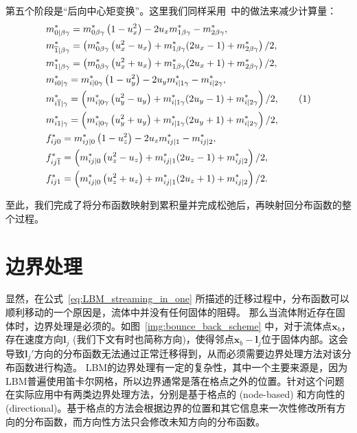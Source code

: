 第五个阶段是“后向中心矩变换”。这里我们同样采用~\citep{Geier-2015}中的做法来减少计算量：
\begin{align*}
    & m_{0 \mid \beta \gamma}^{*}=m_{0 \beta \gamma}^{*}\left(1-u_x^{2}\right)-2u_x m_{1 \beta \gamma}^{*}-m_{2 \beta \gamma}^{*}, \\
    & m_{\overline{1} \mid \beta \gamma}^{*}=\left(m_{0 \beta \gamma}^{*}\left(u_x^{2}-u_x\right)+m_{1 \beta \gamma}^{*}(2 u_x-1)+m_{2 \beta \gamma}^{*}\right) / 2, \\
    & m_{1 \mid \beta \gamma}^{*}=\left(m_{0 \beta \gamma}^{*}\left(u_x^{2}+u_x\right)+m_{1 \beta \gamma}^{*}(2 u_x+1)+m_{2 \beta \gamma}^{*}\right) / 2, \\
    & m_{i 0 \mid \gamma}^{*}=m_{i \mid 0 \gamma}^{*}\left(1-u_y^{2}\right)-2u_y m_{i \mid 1 \gamma}^{*}-m_{i \mid 2 \gamma}^{*}, \\
    & m_{i \overline{1} \mid \gamma}^{*}=\left(m_{i \mid 0 \gamma}^{*}\left(u_y^{2}-u_y\right)+m_{i \mid 1 \gamma}^{*}(2 u_y-1)+m_{i \mid 2 \gamma}^{*}\right) / 2, \stepcounter{equation}\tag{\theequation} \\
    & m_{i 1 \mid \gamma}^{*}=\left(m_{i \mid 0 \gamma}^{*}\left(u_y^{2}+u_y\right)+m_{i \mid 1 \gamma}^{*}(2 u_y+1)+m_{i \mid 2 \gamma}^{*}\right) / 2, \\
    & f_{i j 0}^{*}=m_{i j \mid 0}^{*}\left(1-u_z^{2}\right)-2u_z m_{i j \mid 1}^{*}-m_{i j \mid 2}^{*}, \\
    & f_{i j \overline{1}}^{*}=\left(m_{i j \mid 0}^{*}\left(u_z^{2}-u_z\right)+m_{i j \mid 1}^{*}(2 u_z-1)+m_{i j \mid 2}^{*}\right) / 2, \\
    & f_{i j 1}^{*}=\left(m_{i j \mid 0}^{*}\left(u_z^{2}+u_z\right)+m_{i j \mid 1}^{*}(2 u_z+1)+m_{i j \mid 2}^{*}\right) / 2 .
\end{align*}

至此，我们完成了将分布函数映射到累积量并完成松弛后，再映射回分布函数的整个过程。
    

\section{边界处理}
\label{sec:boundary_treatment}
显然，在公式~\ref{eq:LBM_streaming_in_one} 所描述的迁移过程中，分布函数可以顺利移动的一个原因是，流体中并没有任何固体的阻碍。
那么当流体附近存在固体时，边界处理是必须的。如图~\ref{img:bounce_back_scheme} 中，对于流体点$\bm{x}_b$，存在速度方向$\bm{l}_j$ (我们下文有时也简称方向)，使得邻点$\bm{x}_b-\bm{l}_j$位于固体内部。这会导致$\bm{l}_j'$方向的分布函数无法通过正常迁移得到，从而必须需要边界处理方法对该分布函数进行构造。
LBM的边界处理有一定的复杂性，其中一个主要来源是，因为LBM普遍使用笛卡尔网格，所以边界通常是落在格点之外的位置。针对这个问题在实际应用中有两类边界处理方法，分别是基于格点的 (node-based) 和方向性的 (directional)。基于格点的方法会根据边界的位置和其它信息来一次性修改所有方向的分布函数，而方向性方法只会修改未知方向的分布函数。


